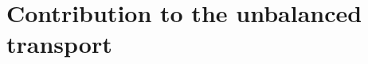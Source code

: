
\chapter[Contribution to the unbalanced transport]{Contribution to the unbalanced transport}
\label{chap:ucoot}

\renewcommand{\contentsname}{Contents}
\localtableofcontents*
{}


\raggedbottom





\vfill